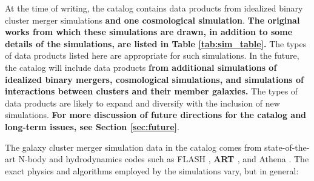 \documentclass{emulateapj}
\begin{document}
At the time of writing, the catalog contains data products from idealized binary cluster merger simulations {\bf and one cosmological simulation}. {\bf The original works from which these simulations are drawn, in addition to some details of the simulations, are listed in Table \ref{tab:sim_table}.} The types of data products listed here are appropriate for such simulations. In the future, the catalog will include data products {\bf from additional simulations of idealized binary mergers, cosmological simulations, and simulations of interactions between clusters and their member galaxies.} The types of data products are likely to expand and diversify with the inclusion of new simulations. \textbf{For more discussion of future directions for the catalog and long-term issues, see Section \ref{sec:future}}.



The galaxy cluster merger simulation data in the catalog comes from state-of-the-art N-body and hydrodynamics codes such as FLASH \citep{dub09}, {\bf ART \citep{kra99, kra02, rud08}}, and Athena \citep{sto08}. The exact physics and algorithms employed by the simulations vary, but in general:
\end{document}
